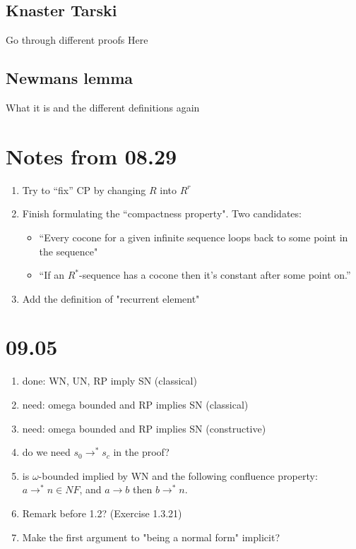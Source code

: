 \documentclass{scrartcl}
\begin{document}
\subsection{Knaster Tarski}
Go through different proofs Here

\subsection{Newmans lemma}
What it is and the different definitions again

\subsection{}

\section{Notes from 08.29}
 
\begin{enumerate}
  \item Try to ``fix'' CP by changing $R$ into $R^r$
  \item Finish formulating the ``compactness property".  Two candidates:
  \begin{itemize}
    \item ``Every cocone for a given infinite sequence loops back to some point in the sequence"
    \item ``If an $R^*$-sequence has a cocone then it's constant after some point on.''
  \end{itemize}
  \item Add the definition of "recurrent element"
\end{enumerate}

\section{09.05}
\begin{enumerate}
  \item done: WN, UN, RP imply SN (classical)
  \item need: omega bounded and RP implies SN (classical)
  \item need: omega bounded and RP implies SN (constructive)
  \item do we need $s_0 \to^* s_c$ in the proof?
  \item is $\omega$-bounded implied by WN and the following confluence property:
  $a \to^* n \in NF$, and $a \to b$ then $b \to^* n $.
  \item Remark before 1.2? (Exercise 1.3.21)
  \item Make the first argument to "being a normal form" implicit?
\end{enumerate}
\end{document}
